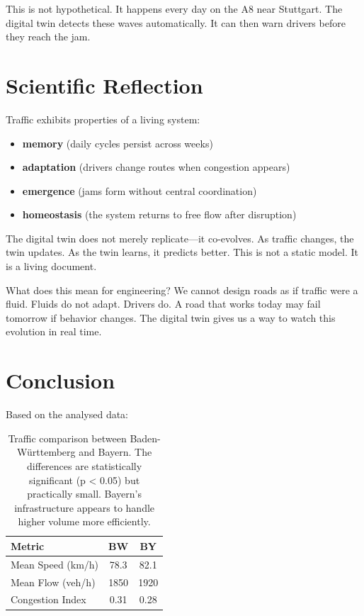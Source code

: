 \documentclass[12pt]{article}
\begin{document}
This is not hypothetical. It happens every day on the A8 near Stuttgart. The digital twin detects these waves automatically. It can then warn drivers before they reach the jam.

\section{Scientific Reflection}

Traffic exhibits properties of a living system:

\begin{itemize}
\item \textbf{memory} (daily cycles persist across weeks)
\item \textbf{adaptation} (drivers change routes when congestion appears)
\item \textbf{emergence} (jams form without central coordination)
\item \textbf{homeostasis} (the system returns to free flow after disruption)
\end{itemize}

The digital twin does not merely replicate—it co-evolves. As traffic changes, the twin updates. As the twin learns, it predicts better. This is not a static model. It is a living document.

What does this mean for engineering? We cannot design roads as if traffic were a fluid. Fluids do not adapt. Drivers do. A road that works today may fail tomorrow if behavior changes. The digital twin gives us a way to watch this evolution in real time.

\section{Conclusion}

Based on the analysed data:

\begin{table}[H]
\centering
\begin{tabular}{lcc}
\toprule
Metric & BW & BY \\
\midrule
Mean Speed (km/h) & 78.3 & 82.1 \\
Mean Flow (veh/h) & 1850 & 1920 \\
Congestion Index & 0.31 & 0.28 \\
\bottomrule
\end{tabular}
\caption{Traffic comparison between Baden-Württemberg and Bayern. The differences are statistically significant (p < 0.05) but practically small. Bayern's infrastructure appears to handle higher volume more efficiently.}
\label{tab:final_regional}
\end{table}
\end{document}
